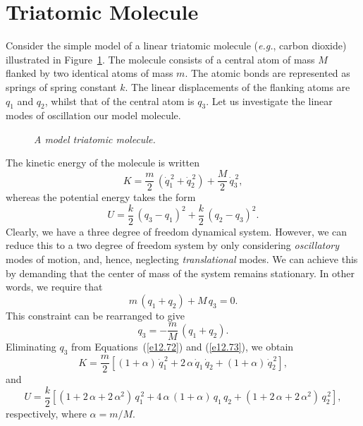 \section{Triatomic Molecule}
Consider the simple model of a linear triatomic molecule ({\em e.g.}, carbon
dioxide) illustrated in Figure~\ref{triatomic}. The molecule consists
of a central atom of mass $M$ flanked by two identical atoms of
mass $m$. The atomic bonds are represented as springs of spring constant $k$.
The linear displacements of the flanking atoms are $q_1$ and $q_2$,
whilst that of the central atom is $q_3$. Let us investigate the linear  modes of oscillation our model molecule.
\begin{figure}
\epsfysize=1.25in
\centerline{}
\caption{\em A model triatomic molecule.}\label{triatomic}
\end{figure}

The kinetic energy of the molecule is written
\begin{equation}\label{e12.72}
K = \frac{m}{2}\,(\dot{q}_1^{\,2} + \dot{q}_2^{\,2})+ \frac{M}{2}\,\dot{q}_3^{\,2},
\end{equation}
whereas the potential energy takes the form
\begin{equation}\label{e12.73}
U = \frac{k}{2}\,(q_3-q_1)^2 + \frac{k}{2}\,(q_2-q_3)^2.
\end{equation}
Clearly, we have a three degree of freedom dynamical system. However, we
can reduce this to a two degree of freedom system by only considering
{\em oscillatory}\/ modes of motion, and, hence, neglecting {\em translational}\/ modes. We can achieve this by demanding that the center
of mass of the system remains stationary. In other words, we require that
\begin{equation}
m\,(q_1+q_2) + M\,q_3 = 0.
\end{equation}
This constraint can be rearranged to give
\begin{equation}\label{e12.75}
q_3 = - \frac{m}{M}\,(q_1+q_2).
\end{equation}
Eliminating $q_3$ from Equations~(\ref{e12.72}) and (\ref{e12.73}), we obtain
\begin{equation}
K = \frac{m}{2}\left[(1+\alpha)\,\dot{q}_1^{\,2} + 2\,\alpha\,\dot{q}_1\,\dot{q}_2 + (1+\alpha)\,\dot{q}_2^{\,2}\right],
\end{equation}
and
\begin{equation}
U = \frac{k}{2}\left[(1+2\,\alpha+2\,\alpha^2)\,q_1^{\,2} + 4\,\alpha\,(1+\alpha)\,q_1\,q_2 +(1+2\,\alpha+2\,\alpha^2)\,q_2^{\,2}\right],
\end{equation}
respectively, where $\alpha =m/M$. 

